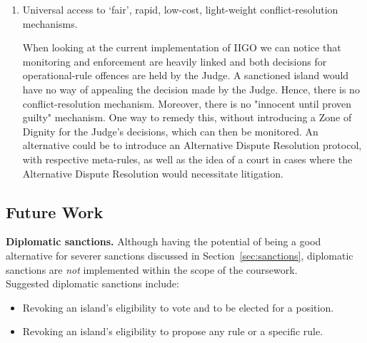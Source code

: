 \begin{enumerate}
    \item Universal access to ‘fair’, rapid, low-cost, light-weight conflict-resolution mechanisms.
    
    When looking at the current implementation of IIGO we can notice that monitoring and enforcement are heavily linked and both decisions for operational-rule offences are held by the Judge. A sanctioned island would have no way of appealing the decision made by the Judge. Hence, there is no conflict-resolution mechanism. Moreover, there is no "innocent until proven guilty" mechanism. One way to remedy this, without introducing a Zone of Dignity for the Judge's decisions, which can then be monitored. An alternative could be to introduce an Alternative Dispute Resolution protocol, with respective meta-rules, as well as the idea of a court in cases where the Alternative Dispute Resolution would necessitate litigation. 

\end{enumerate}
\subsection{Future Work}

\textbf{Diplomatic sanctions.} Although having the potential of being a good alternative for severer sanctions discussed in  Section~\ref{sec:sanctions}, diplomatic sanctions are \emph{not} implemented within the scope of the coursework. \\
    Suggested diplomatic sanctions include:
        \begin{itemize}
            \item Revoking an island's eligibility to vote and to be elected for a position.
            \item Revoking an island's eligibility to propose any rule or a specific rule.
        \end{itemize}


